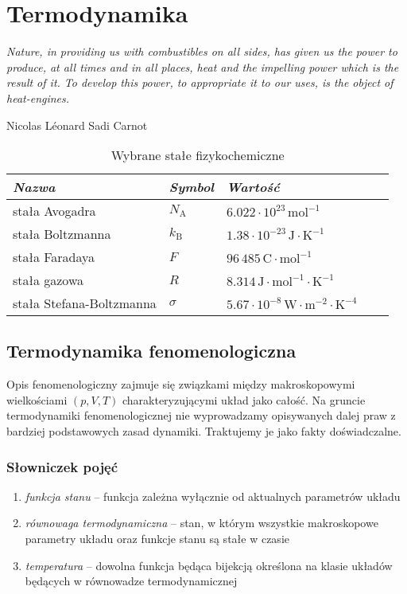 \documentclass[../main.tex]{subfiles}
\begin{document}
\section{Termodynamika}
\textit{Nature, in providing us with combustibles on all sides, has given us the power to produce, at all times and in all places, heat and the impelling power which is the result of it. To develop this power, to appropriate it to our uses, is the object of heat-engines.}\begin{flushright}Nicolas Léonard Sadi Carnot\end{flushright}

\begin{table}[h]
    \centering
    \begin{tabular}{ *5l }    \toprule
    \emph{Nazwa} & \emph{Symbol} & \emph{Wartość}  \\\midrule
    stała Avogadra    & \(N_\text{A}\)  & \(6.022\cdot 10^{23}\,\text{mol}^{-1}\)    \\ 
    stała Boltzmanna  & \(k_\text{B}\) & \(1.38\cdot 10^{-23}\,\text{J}\cdot\text{K}^{-1}\)  \\ 
    stała Faradaya  & \(F\) & \(96\,485\,\text{C}\cdot\text{mol}^{-1}\)  \\
    stała gazowa     & \(R\)  & \(8.314\,\text{J}\cdot\text{mol}^{-1}\cdot\text{K}^{-1}\)   \\ 
    stała Stefana-Boltzmanna  & \(\sigma\) & \(5.67\cdot 10^{-8}\,\text{W}\cdot\text{m}^{-2}\cdot\text{K}^{-4}\)\\ 
    
    \bottomrule
    \hline
\end{tabular}
\caption{Wybrane stałe fizykochemiczne}
\end{table}

\subsection{Termodynamika fenomenologiczna}
Opis fenomenologiczny zajmuje się związkami między makroskopowymi wielkościami \((p,V,T)\) charakteryzującymi układ jako całość. Na gruncie termodynamiki fenomenologicznej nie wyprowadzamy opisywanych dalej praw z bardziej podstawowych zasad dynamiki. Traktujemy je jako fakty doświadczalne.
\subsubsection*{Słowniczek pojęć}
\begin{enumerate}
    \item \textit{funkcja stanu} -- funkcja zależna wyłącznie od aktualnych parametrów układu
    \item \textit{równowaga termodynamiczna} -- stan, w którym wszystkie makroskopowe parametry układu oraz funkcje stanu są stałe w czasie
    \item \textit{temperatura} -- dowolna funkcja będąca bijekcją określona na klasie układów będących w równowadze termodynamicznej
\end{enumerate}
\end{document}
